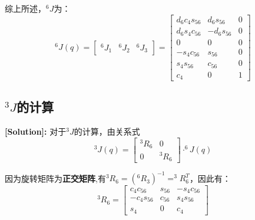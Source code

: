 \documentclass{ctexart}
\begin{document}
综上所述，$^6J$为：
\begin{equation}
	^6J (q)= \begin{bmatrix}
		^6J_1 & ^6J_2 & ^6J_3
	\end{bmatrix} = \begin{bmatrix}
		d_6c_4s_{56} & d_6s_{56} & 0\\
		d_6s_4c_{56} & -d_6s_{56} & 0\\
		0 & 0 & 0 \\
		-s_4c_{56} & s_{56} & 0\\
		s_4s_{56} & c_{56} & 0\\
		c_4 & 0 & 1
	\end{bmatrix}
\end{equation}

\subsection{$^3J$的计算}

\textbf{[Solution]:}
对于$^3J$的计算，由关系式
\begin{equation}
	^3J (q)= \begin{bmatrix}
		^3R_6 & 0\\
		0 & ^3R_6
	\end{bmatrix} \cdot ^6J(q)
\end{equation}

因为旋转矩阵为\textbf{正交矩阵},有$^3R_6 = (^6R_3)^{-1} = ^3R_6^T$，因此有：
\begin{equation*}
	^3R_6 = \begin{bmatrix}
		c_4c_{56} & s_{56} & -s_4c_{56}\\
		-c_4s_{56} & c_{56} & s_4s_{56}\\
		s_4 & 0 & c_4
	\end{bmatrix}
\end{equation*}
\end{document}
